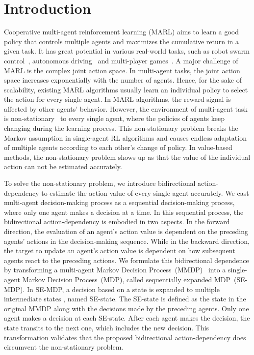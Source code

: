 \documentclass[letterpaper]{article} \usepackage{aaai23}  \usepackage{times}  \usepackage{helvet}  \usepackage{courier}  \usepackage[hyphens]{url}  \usepackage{graphicx} \urlstyle{rm} \def\UrlFont{\rm}  \usepackage{natbib}  \usepackage{caption} \frenchspacing  \setlength{\pdfpagewidth}{8.5in} \setlength{\pdfpageheight}{11in} \usepackage{algorithm}
\begin{document}
 \section{Introduction}
\vspace{-0.5ex}
Cooperative multi-agent reinforcement learning (MARL) aims to learn a good policy that controls multiple agents and maximizes the cumulative return in a given task. It has great potential in various real-world tasks, such as robot swarm control~\citeyear{swarm}, autonomous driving~\citeyear{smarts,safe_ad} and multi-player games~\citeyear{mobo,pettingzoo}. A major challenge of MARL is the complex joint action space. In multi-agent tasks, the joint action space increases exponentially with the number of agents. Hence, for the sake of scalability, existing MARL algorithms usually learn an individual policy to select the action for every single agent. In MARL algorithms, the reward signal is affected by other agents' behavior. However, the environment of multi-agent task is non-stationary~\citeyear{non_stationarity,multireview} to every single agent, where the policies of agents keep changing during the learning process. This non-stationary problem breaks the Markov assumption in single-agent RL algorithms and causes endless adaptation of multiple agents according to each other's change of policy.
In value-based methods, the non-stationary problem shows up as that the value of the individual action can not be estimated accurately.

To solve the non-stationary problem, we introduce bidirectional action-dependency to estimate the action value of every single agent accurately. 
We cast multi-agent decision-making process as a sequential decision-making process, where only one agent makes a decision at a time.
In this sequential process, the bidirectional action-dependency is embodied in two aspects. 
In the forward direction, the evaluation of an agent's action value is dependent on the preceding agents' actions in the decision-making sequence.
While in the backward direction, the target to update an agent's action value is dependent on how subsequent agents react to the preceding actions. 
We formulate this bidirectional dependence by transforming a multi-agent Markov Decision Process~(MMDP)~\citeyear{markov} into a single-agent Markov Decision Process~(MDP), called sequentially expanded MDP~(SE-MDP). In SE-MDP, a decision  based on a state  is expanded to multiple intermediate states , named SE-state. The SE-state  is defined as the state  in the original MMDP along with the decisions  made by the preceding agents. Only one agent makes a decision at each SE-state. After each agent makes the decision, the state transits to the next one, which includes the new decision. This transformation validates that the proposed bidirectional action-dependency does circumvent the non-stationary problem.
\end{document}
